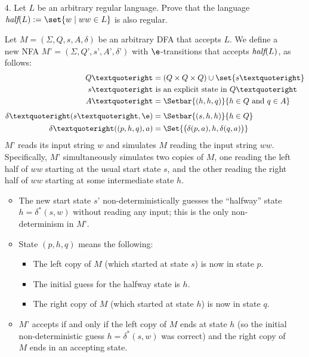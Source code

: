 \documentclass[11pt]{article}
\begin{document}
\begin{enumerate}
\item[4.]  Let $L$ be an arbitrary regular language.  Prove that the language
$\emph{half}(L) := \set{w \mid ww\in L}$ is also regular.

\begin{solution}
Let $M = (\Sigma, Q, s, A, \delta)$ be an arbitrary DFA that accepts $L$.  We define a new NFA $M’ = (\Sigma, Q’, s’, A’, \delta’)$ with $\e$-transitions that accepts $\emph{half}(L)$, as follows:
\begin{align*}
	Q’ & = (Q\times Q\times Q) \cup \set{s’} \\
	s’ & \text{~is an explicit state in $Q’$} \\
	A’ &= \Setbar{(h, h, q)}{h\in Q \text{~and~} q\in A}
	\\[1ex]
	\delta’(s’, \e) &= \Setbar{(s, h, h)}{h\in Q} \\
	\delta’((p, h, q), a) &= \Set{\big(\delta(p, a), h, \delta(q, a)\big)}
\end{align*}
$M’$ reads its input string $w$ and simulates $M$ reading the input string $ww$.  Specifically, $M’$ simultaneously simulates two copies of $M$, one reading the left half of $ww$ starting at the usual start state $s$, and the other reading the right half of $ww$ starting at some intermediate state $h$.
\begin{itemize}
\item
The new start state $s’$ non-deterministically guesses the “halfway” state $h = \delta^*(s, w)$ without reading any input; this is the only non-determinism in $M’$.
\item
State $(p, h, q)$ means the following:
\begin{itemize}
\item The left copy of $M$ (which started at state $s$) is now in state $p$.
\item The initial guess for the halfway state is $h$.
\item The right copy of $M$ (which started at state $h$) is now in state $q$.
\end{itemize}
\item
$M’$ accepts if and only if the left copy of $M$ ends at state $h$ (so the initial non-deterministic guess $h = \delta^*(s, w)$ was correct) and the right copy of $M$ ends in an accepting state.
\end{itemize}
\end{solution}


\end{enumerate}
\end{document}
